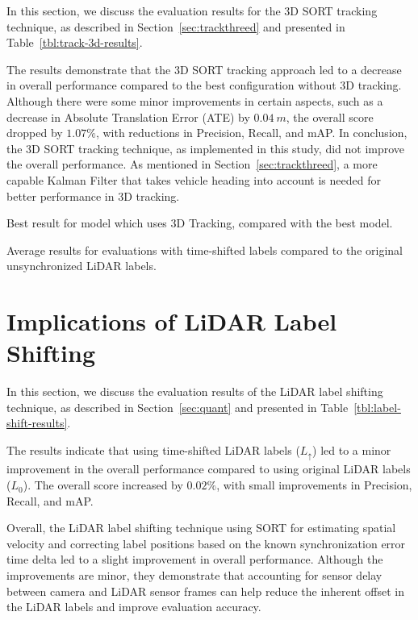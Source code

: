 In this section, we discuss the evaluation results for the 3D SORT tracking technique, as described in Section~\ref{sec:trackthreed} and presented in Table~\ref{tbl:track-3d-results}.

The results demonstrate that the 3D SORT tracking approach led to a decrease in overall performance compared to the best configuration without 3D tracking.
Although there were some minor improvements in certain aspects, such as a decrease in Absolute Translation Error (ATE) by $0.04~m$, the overall score dropped by $1.07\%$, with reductions in Precision, Recall, and mAP.
In conclusion, the 3D SORT tracking technique, as implemented in this study, did not improve the overall performance.
As mentioned in Section~\ref{sec:trackthreed}, a more capable Kalman Filter that takes vehicle heading into account is needed for better performance in 3D tracking.

\begin{table}[h!]
    
    \caption{Best result for model which uses 3D Tracking, compared with the best model.}
    \label{tbl:track-3d-results}
\end{table}

\begin{table}[h!]
    
    \caption{Average results for evaluations with time-shifted labels compared to the original unsynchronized LiDAR labels.}
    \label{tbl:label-shift-results}
\end{table}

\section{Implications of LiDAR Label Shifting}
\label{sec:impactlidar}

In this section, we discuss the evaluation results of the LiDAR label shifting technique, as described in Section~\ref{sec:quant} and presented in Table~\ref{tbl:label-shift-results}.

The results indicate that using time-shifted LiDAR labels ($L_{\uparrow}$) led to a minor improvement in the overall performance compared to using original LiDAR labels ($L_0$).
The overall score increased by $0.02\%$, with small improvements in Precision, Recall, and mAP.

Overall, the LiDAR label shifting technique using SORT for estimating spatial velocity and correcting label positions based on the known synchronization error time delta led to a slight improvement in overall performance.
Although the improvements are minor, they demonstrate that accounting for sensor delay between camera and LiDAR sensor frames can help reduce the inherent offset in the LiDAR labels and improve evaluation accuracy.

